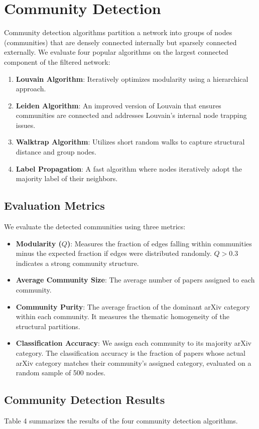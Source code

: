 \documentclass[11pt,a4paper]{article}
\begin{document}
\section{Community Detection}
Community detection algorithms partition a network into groups of nodes (communities) that are densely connected internally but sparsely connected externally. We evaluate four popular algorithms on the largest connected component of the filtered network:
\begin{enumerate}
    \item \textbf{Louvain Algorithm}: Iteratively optimizes modularity using a hierarchical approach.
    \item \textbf{Leiden Algorithm}: An improved version of Louvain that ensures communities are connected and addresses Louvain's internal node trapping issues.
    \item \textbf{Walktrap Algorithm}: Utilizes short random walks to capture structural distance and group nodes.
    \item \textbf{Label Propagation}: A fast algorithm where nodes iteratively adopt the majority label of their neighbors.
\end{enumerate}

\subsection{Evaluation Metrics}
We evaluate the detected communities using three metrics:
\begin{itemize}
    \item \textbf{Modularity ($Q$)}: Measures the fraction of edges falling within communities minus the expected fraction if edges were distributed randomly. $Q > 0.3$ indicates a strong community structure.
    \item \textbf{Average Community Size}: The average number of papers assigned to each community.
    \item \textbf{Community Purity}: The average fraction of the dominant arXiv category within each community. It measures the thematic homogeneity of the structural partitions.
    \item \textbf{Classification Accuracy}: We assign each community to its majority arXiv category. The classification accuracy is the fraction of papers whose actual arXiv category matches their community's assigned category, evaluated on a random sample of 500 nodes.
\end{itemize}

\subsection{Community Detection Results}
Table 4 summarizes the results of the four community detection algorithms.
\end{document}
